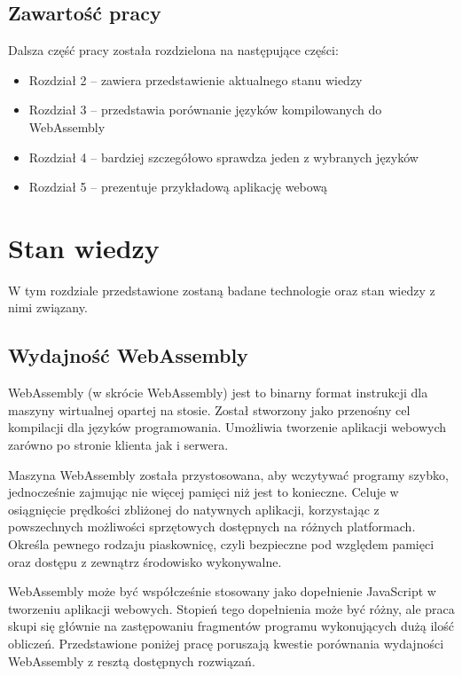 \documentclass[language=polish,type=master]{aghmodern}
\begin{document}
\section{Zawartość pracy}
Dalsza część pracy została rozdzielona na następujące części:

\begin{itemize}
    \item Rozdział 2 -- zawiera przedstawienie aktualnego stanu wiedzy
    \item Rozdział 3 -- przedstawia porównanie języków kompilowanych do WebAssembly
    \item Rozdział 4 -- bardziej szczegółowo sprawdza jeden z wybranych języków
    \item Rozdział 5 -- prezentuje przykładową aplikację webową
\end{itemize}

\chapter{Stan wiedzy}
W tym rozdziale przedstawione zostaną badane technologie oraz stan wiedzy z nimi związany.

\section{Wydajność WebAssembly}
WebAssembly (w skrócie WebAssembly) jest to binarny format instrukcji dla maszyny wirtualnej opartej na stosie.
Został stworzony jako przenośny cel kompilacji dla języków programowania.
Umożliwia tworzenie aplikacji webowych zarówno po stronie klienta jak i serwera.

Maszyna WebAssembly została przystosowana, aby wczytywać programy szybko, jednocześnie zajmując nie więcej pamięci niż jest to konieczne.
Celuje w osiągnięcie prędkości zbliżonej do natywnych aplikacji, korzystając z powszechnych możliwości sprzętowych dostępnych na różnych platformach.
Określa pewnego rodzaju piaskownicę\footnotemark{}, czyli bezpieczne pod względem pamięci oraz dostępu z zewnątrz środowisko wykonywalne.

WebAssembly może być współcześnie stosowany jako dopełnienie JavaScript w tworzeniu aplikacji webowych.
Stopień tego dopełnienia może być różny, ale praca skupi się głównie na zastępowaniu fragmentów programu wykonujących dużą ilość obliczeń.
Przedstawione poniżej pracę poruszają kwestie porównania wydajności WebAssembly z resztą dostępnych rozwiązań.
\end{document}

